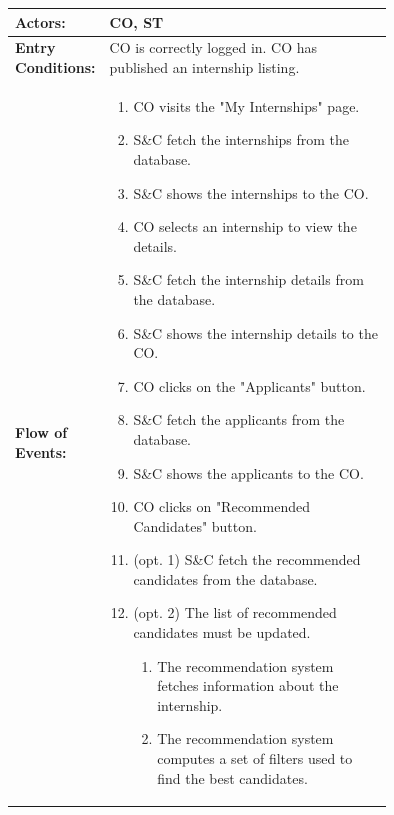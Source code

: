 \begin{center}
    \begin{longtable}{|l|p{0.75\linewidth}|}
        \hline
        \textbf{Actors:}           & CO, ST                                                                                                                \\
        \hline
        \textbf{Entry Conditions:} & CO is correctly logged in. CO has published an internship listing.                                                    \\
        \hline
        \textbf{Flow of Events:}   & \begin{enumerate}
                                         \item CO visits the "My Internships" page.
                                         \item S\&C fetch the internships from the database.
                                         \item S\&C shows the internships to the CO.
                                         \item CO selects an internship to view the details.
                                         \item S\&C fetch the internship details from the database.
                                         \item S\&C shows the internship details to the CO.
                                         \item CO clicks on the "Applicants" button.
                                         \item S\&C fetch the applicants from the database.
                                         \item S\&C shows the applicants to the CO.
                                         \item CO clicks on "Recommended Candidates" button.
                                         \item (opt. 1) S\&C fetch the recommended candidates from the database.
                                         \item (opt. 2) The list of recommended candidates must be updated.
                                               \begin{enumerate}
                      \item The recommendation system fetches information about the internship.
                      \item The recommendation system computes a set of filters used to find the best candidates.

\end{enumerate}
\end{enumerate}
\end{longtable}
\end{center}
